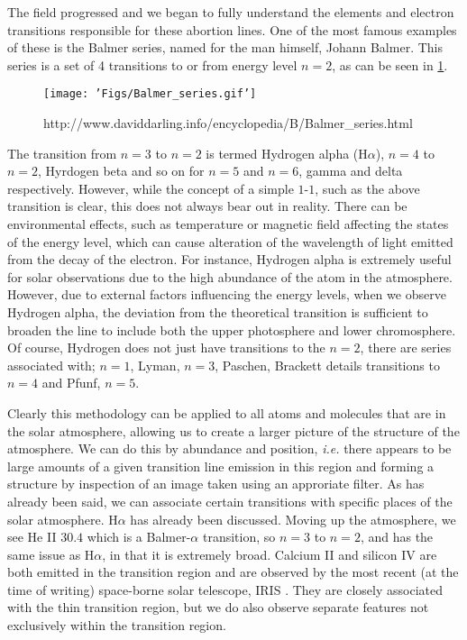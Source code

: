 The field progressed and we began to fully understand the elements and electron transitions responsible for these abortion lines.
One of the most famous examples of these is the Balmer series, named for the man himself, Johann Balmer.
This series is a set of 4 transitions to or from energy level $n = 2$, as can be seen in \ref{fig:balmer}.

\begin{figure}
	\texttt{[image: 'Figs/Balmer\_series.gif']}
	\caption{http://www.daviddarling.info/encyclopedia/B/Balmer_series.html}
	\label{fig:balmer}
\end{figure}

The transition from $n=3$ to $n=2$ is termed Hydrogen alpha (H$\alpha$), $n=4$ to $n=2$, Hyrdogen beta and so on for $n=5$ and $n=6$, gamma and delta respectively. 
However, while the concept of a simple $1$-$1$, such as the above transition is clear, this does not always bear out in reality.
There can be environmental effects, such as temperature or magnetic field affecting the states of the energy level, which can cause alteration of the wavelength of light emitted from the decay of the electron.
For instance, Hydrogen alpha is extremely useful for solar observations due to the high abundance of the atom in the atmosphere.
However, due to external factors influencing the energy levels, when we observe Hydrogen alpha, the deviation from the theoretical transition is sufficient to broaden the line to include both the upper photosphere and lower chromosphere.
Of course, Hydrogen does not just have transitions to the $n=2$, there are series associated with; $n=1$, Lyman, $n=3$, Paschen, Brackett details transitions to $n=4$ and Pfunf, $n=5$.

Clearly this methodology can be applied to all atoms and molecules that are in the solar atmosphere, allowing us to create a larger picture of the structure of the atmosphere.
We can do this by abundance and position, \emph{i.e.} there appears to be large amounts of a given transition line emission in this region and forming a structure by inspection of an image taken using an approriate filter.
As has already been said, we can associate certain transitions with specific places of the solar atmosphere.
H$\alpha$ has already been discussed.
Moving up the atmosphere, we see He II $30.4$ \cite{Bazin2010} which is a Balmer-$\alpha$ transition, so $n=3$ to $n=2$, and has the same issue as H$\alpha$, in that it is extremely broad.
Calcium II and silicon IV are both emitted in the transition region and are observed by the most recent (at the time of writing) space-borne solar telescope, IRIS \cite{PereiraIRIS2014}.
They are closely associated with the thin transition region, but we do also observe separate features not exclusively within the transition region.

